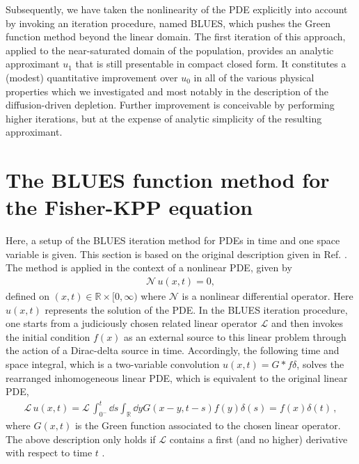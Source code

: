\documentclass[amsmath,amssymb,amsfonts,aps,pre,preprint,superscriptaddress,showpacs,showkeys,longbibliography,nofootinbib]{revtex4-1}
\newcommand*{\lop}{\mathcal{L}\,}
\newcommand*{\nlop}{\mathcal{N}\,}
\begin{document}
Subsequently, we have taken the nonlinearity of the PDE explicitly into account by invoking an iteration procedure, named BLUES, which pushes the Green function method beyond the linear domain. The first iteration of this approach, applied to the near-saturated domain of the population, provides an analytic approximant $u_1$ that is still presentable in compact closed form. It constitutes a (modest) quantitative improvement over $u_0$ in all of the various physical properties which we investigated and most notably in the description of the diffusion-driven depletion. Further improvement is conceivable by performing higher iterations, but at the expense of analytic simplicity of the resulting approximant. 

\appendix
\section{The BLUES function method for the Fisher-KPP equation}\label{sec:BLUES_method_pde}
Here, a setup of the BLUES iteration method for PDEs in time and one space variable is given. This section is based on the original description given in Ref. \cite{Berx_2021}. The method is applied in the context of a nonlinear PDE, given by
\begin{align}\label{eq:nonlinear_PDE}
    \nlop u(x,t)=0,
\end{align}
defined on $(x,t) \in \mathbb{R} \times [0,\infty)$ where $\mathcal{N}$ is a nonlinear differential operator. Here $u(x,t)$ represents the solution of the PDE. In the BLUES iteration procedure, one starts from a judiciously chosen related linear operator $\mathcal{L}$ and then invokes the initial condition $f(x)$ as an external source to this linear problem through the action of a Dirac-delta source in time. Accordingly, the following time and space integral, which is a two-variable convolution $u(x, t) = G \ast f \delta$, solves the rearranged inhomogeneous linear PDE, which is equivalent to the original linear PDE, 
\begin{align}
 \label{eq:rewriten_linear_operator_delta_u_appendix}
		\lop u(x, t)=\lop \int_{0^{-}}^{t} \dd{s} \int_{\mathbb{R}} \dd{y} G\left(x-y, t-s\right) f\left(y\right) \delta\left(s\right)=f(x) \delta(t)\,,
\end{align}
where $G(x,t)$ is the Green function associated to the chosen linear operator. The above description only holds if $\mathcal{L}$ contains a first (and no higher) derivative with respect to time $t$ \cite{Berx_2021}. 
\end{document}
